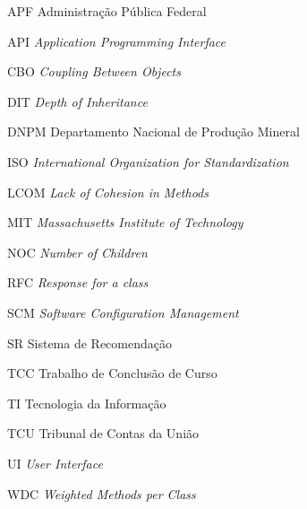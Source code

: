 \begin{siglas}
 \item[APF] Administração Pública Federal
 \item[API] \textit{Application Programming Interface}
 \item[CBO] \textit{Coupling Between Objects}
 \item[DIT] \textit{Depth of Inheritance} 
 \item [DNPM] Departamento Nacional de Produção Mineral 
 \item[ISO] \textit{International Organization for Standardization}
 \item[LCOM] \textit{Lack of Cohesion in Methods}
 \item[MIT] \textit{Massachusetts Institute of Technology}
 \item[NOC] \textit{Number of Children}
 \item[RFC] \textit{Response for a class}
 \item [SCM] \textit{Software Configuration Management}
 \item [SR] Sistema de Recomendação
 \item [TCC] Trabalho de Conclusão de Curso
 \item[TI] Tecnologia da Informação 
 \item[TCU] Tribunal de Contas da União
 \item [UI] \textit{User Interface}
 \item[WDC] \textit{Weighted Methods per Class}
\end{siglas}
